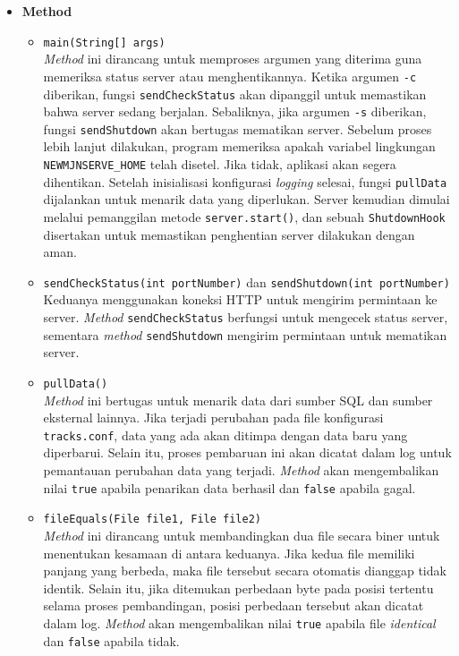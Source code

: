 \begin{itemize}
    \item \textbf{Method}
    \begin{itemize}
        \item \texttt{main(String[] args)}
        \\ \textit{Method} ini dirancang untuk memproses argumen yang diterima guna memeriksa status server atau menghentikannya. Ketika argumen \texttt{-c} diberikan, fungsi \texttt{sendCheckStatus} akan dipanggil untuk memastikan bahwa server sedang berjalan. Sebaliknya, jika argumen \texttt{-s} diberikan, fungsi \texttt{sendShutdown} akan bertugas mematikan server. Sebelum proses lebih lanjut dilakukan, program memeriksa apakah variabel lingkungan \texttt{NEWMJNSERVE\_HOME} telah disetel. Jika tidak, aplikasi akan segera dihentikan. Setelah inisialisasi konfigurasi \textit{logging} selesai, fungsi \texttt{pullData} dijalankan untuk menarik data yang diperlukan. Server kemudian dimulai melalui pemanggilan metode \texttt{server.start()}, dan sebuah \texttt{ShutdownHook} disertakan untuk memastikan penghentian server dilakukan dengan aman.
        
        \item \texttt{sendCheckStatus(int portNumber)} dan \texttt{sendShutdown(int portNumber)}
        \\ Keduanya menggunakan koneksi HTTP untuk mengirim permintaan ke server. \textit{Method} \texttt{sendCheckStatus} berfungsi untuk mengecek status server, sementara \textit{method} \texttt{sendShutdown} mengirim permintaan untuk mematikan server.

        \item \texttt{pullData()}
        \\ \textit{Method} ini bertugas untuk menarik data dari sumber SQL dan sumber eksternal lainnya. Jika terjadi perubahan pada file konfigurasi \texttt{tracks.conf}, data yang ada akan ditimpa dengan data baru yang diperbarui. Selain itu, proses pembaruan ini akan dicatat dalam log untuk pemantauan perubahan data yang terjadi. \textit{Method} akan mengembalikan nilai \texttt{true} apabila penarikan data berhasil dan \texttt{false} apabila gagal.

        \item \texttt{fileEquals(File file1, File file2)}
        \\ \textit{Method} ini dirancang untuk membandingkan dua file secara biner untuk menentukan kesamaan di antara keduanya. Jika kedua file memiliki panjang yang berbeda, maka file tersebut secara otomatis dianggap tidak identik. Selain itu, jika ditemukan perbedaan byte pada posisi tertentu selama proses pembandingan, posisi perbedaan tersebut akan dicatat dalam log. \textit{Method} akan mengembalikan nilai \texttt{true} apabila file \textit{identical} dan \texttt{false} apabila tidak.
        
    \end{itemize}
\end{itemize}

